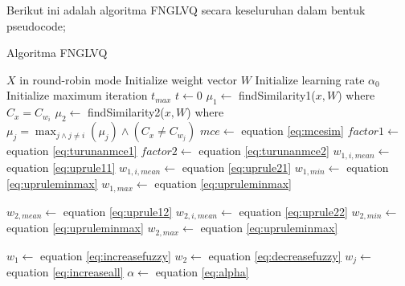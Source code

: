 \clearpage

\noindent Berikut ini adalah algoritma FNGLVQ secara keseluruhan dalam bentuk
pseudocode;

\begin{algorithm}  
\scriptsize 
\caption{Algoritma FNGLVQ}          
\label{alg:fnglvq}                           
\begin{algorithmic}                    %
	\REQUIRE $X$ in round-robin mode
	\STATE Initialize weight vector $W$
	\STATE Initialize learning rate $\alpha_0$
	\STATE Initialize maximum iteration $t_{max}$
	\STATE $t \leftarrow 0$
			\STATE $\mu_1 \leftarrow $ findSimilarity1($x, W$) where $C_x = C_{w_i}$
			\STATE $\mu_2 \leftarrow $ findSimilarity2($x, W$) where $\mu_j = \max_{j
			\wedge j \neq i}(\mu_j) \wedge (C_x \neq C_{w_j})$
				\STATE $mce \leftarrow $ equation \ref{eq:mcesim}
				\STATE $factor1 \leftarrow $ equation \ref{eq:turunanmce1}
				\STATE $factor2 \leftarrow $ equation \ref{eq:turunanmce2}
				\STATE
				\STATE {}
						\STATE $w_{1, i,mean} \leftarrow $ equation \ref{eq:uprule11}
						\STATE $w_{1, i,mean} \leftarrow $ equation \ref{eq:uprule21}
					\ENDIF
				\ENDFOR
				\STATE $w_{1,min} \leftarrow $ equation \ref{eq:upruleminmax}
				\STATE $w_{1,max} \leftarrow $ equation \ref{eq:upruleminmax}
				
				\STATE
				\STATE {}
						\STATE $w_{2,mean} \leftarrow $ equation \ref{eq:uprule12}
						\STATE $w_{2, i, mean} \leftarrow $ equation \ref{eq:uprule22}
					\ENDIF
				\ENDFOR	
				\STATE $w_{2,min} \leftarrow $ equation \ref{eq:upruleminmax}
				\STATE $w_{2,max} \leftarrow $ equation \ref{eq:upruleminmax}
	
				\STATE
					\STATE {}
					\STATE $w_1 \leftarrow$ equation \ref{eq:increasefuzzy}
				\ELSE
					\STATE {}
					\STATE $w_2 \leftarrow$  equation \ref{eq:decreasefuzzy}
				\ENDIF
			\ELSE
				\STATE {}
					\STATE $w_j \leftarrow $ equation \ref{eq:increaseall}
				\ENDFOR
			\ENDIF
		\ENDFOR
	\ENDWHILE
	\STATE $\alpha \leftarrow $ equation \ref{eq:alpha} 
\end{algorithmic}
\end{algorithm}  

